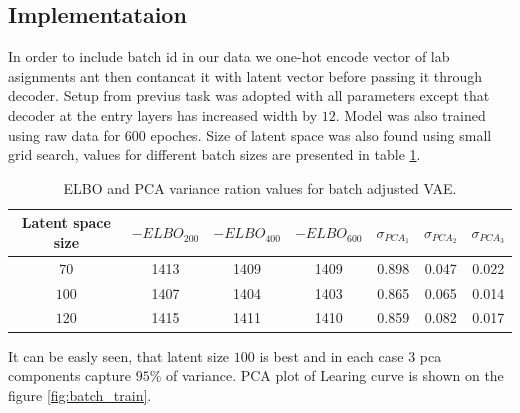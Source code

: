 \documentclass[12pt,a4paper]{article}
\begin{document}
\subsection{Implementataion}
In order to include batch id in our data we one-hot encode vector of lab asignments ant then contancat it with latent vector before passing it through decoder.
Setup from previus task was adopted with all parameters except that decoder at the entry layers has increased width by $12$. Model was also trained using raw 
data for $600$ epoches. Size of latent space was also found using small grid search, values for different batch sizes are presented in  table \ref{table_batch}.
\begin{center}
\begin{table}[H]
    \begin{tabular}{ |c| c| c |c |c |c| c| }
    \hline \hline
     Latent space size & $-ELBO_{200}$ & $-ELBO_{400}$ & $-ELBO_{600}$ & $\sigma_{PCA_1}$ &$\sigma_{PCA_2}$ &$\sigma_{PCA_3}$ \\    
    \hline \hline
    $70$ & 1413 &1409& 1409& 0.898 &0.047 & 0.022 \\ 
    \hline
    $100$ & 1407 &1404 & 1403& 0.865 & 0.065 & 0.014 \\
    \hline
    $120$ & 1415 & 1411& 1410 & 0.859 & 0.082 &0.017\\
    \hline \hline
\end{tabular}
\caption{ELBO and PCA variance ration values for batch adjusted VAE.}\label{table_batch}
\end{table}
\end{center}
It can be easly seen, that latent size $100$ is best and in each case $3$ pca components capture $95\%$ of variance. PCA plot of 
Learing curve is shown on the figure \ref{fig:batch_train}.
\end{document}
